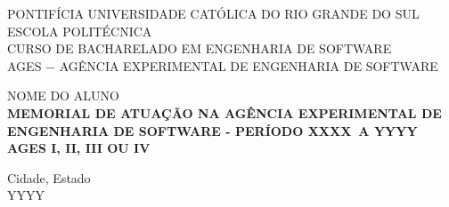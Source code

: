 \author{Gustavo}

\def\autor{\uppercase{Nome do Aluno}}
\def\inicio{XXXX}
\def\fim{YYYY}
\def\ages{I, II, III ou IV}
\def\local{Cidade, Estado}
\def\ano{YYYY}

\begin{capa}
  \centering
    \uppercase{
      PONTIFÍCIA UNIVERSIDADE CATÓLICA DO RIO GRANDE DO SUL\\
      ESCOLA POLITÉCNICA\\
      CURSO DE BACHARELADO EM ENGENHARIA DE SOFTWARE\\
      AGES $-$ AGÊNCIA EXPERIMENTAL DE ENGENHARIA DE SOFTWARE\\
      }

    \vfill
    \autor\\
    \vfill
    \textbf{
      \uppercase{
        Memorial de atuação na Agência Experimental de Engenharia de Software 
        {-} Período \inicio\ a \fim\
        \\AGES \ages\
      }
    }
    
    \vfill

    \vfill
    \local\\
    \ano\
  \end{capa}